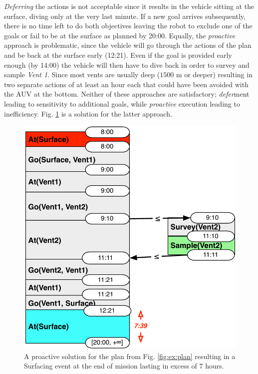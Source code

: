 {\em Deferring} the actions is not acceptable since it results in the
vehicle sitting at the surface, diving only at the very last
minute. If a new goal arrives subsequently, there is no time left to
do both objectives leaving the robot to exclude one of the goals or
fail to be at the surface as planned by 20:00. Equally, the {\em
  proactive} approach is problematic, since the vehicle will go
through the actions of the plan and be back at the surface early
(12:21). Even if the goal is provided early enough (by 14:00) the
vehicle will then have to dive back in order to survey and sample {\em
  Vent 1}.
Since most vents are usually deep ($1500$ m or deeper) resulting in
two separate actions of at least an hour each that could have been
avoided with the AUV at the bottom. Neither of these approaches are
satisfactory; {\em defer}ment leading to sensitivity to additional
goals, while \emph{proactive} execution leading to
inefficiency. Fig. \ref{fig:ex:proactive} is a solution for the latter
approach.



\begin{figure}
  \centering
  \includegraphics[width=0.65\columnwidth]{figs/example_early}
  \caption{\small A proactive solution for the plan from
    Fig. \ref{fig:ex:plan} resulting in a Surfacing event at the end
    of mission lasting in excess of $7$ hours.}
  \label{fig:ex:proactive}
\end{figure}

